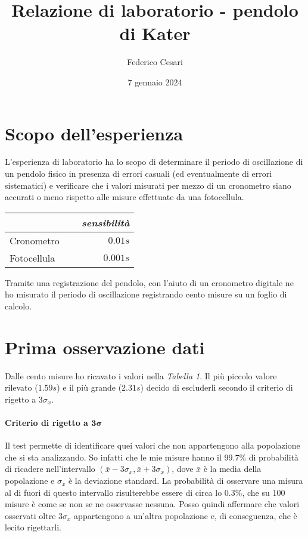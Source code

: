\documentclass{article}
\title{Relazione di laboratorio - pendolo di Kater}
\author{Federico Cesari}
\date{7 gennaio 2024}
\begin{document}
	

	
	\section{Scopo dell'esperienza}
	L'esperienza di laboratorio ha lo scopo di determinare il periodo di oscillazione di un pendolo fisico in presenza di errori casuali (ed eventualmente di errori sistematici) e verificare che i valori misurati per mezzo di un cronometro siano accurati o meno rispetto alle misure effettuate da una fotocellula. 
	
	\vspace{0.5cm}
	\begin{table}[H]
		\centering
		\renewcommand{\arraystretch}{1.5}
		\begin{tabular}{lr}
			 & \textit{sensibilità}\\
			 \hline
			Cronometro $\quad$                	& $0.01s$    \\
			Fotocellula  $\quad$                & $0.001s$    \\
		\end{tabular}
		\renewcommand{\arraystretch}{1}
	\end{table}
	\vspace{0.5cm}
	
	Tramite una registrazione del pendolo, con l'aiuto di un cronometro digitale ne ho misurato il periodo di oscillazione registrando cento misure su un foglio di calcolo. 
	
	
	

	\section{Prima osservazione dati}
	
	Dalle cento misure ho ricavato i valori nella \textit{Tabella 1}. Il più piccolo valore rilevato ($1.59s$) e il più grande ($2.31s$) decido di escluderli secondo il criterio di rigetto a $3\sigma_{x}$.
	
	\paragraph{Criterio di rigetto a $\mathbf{3\sigma}$}
	Il test permette di identificare quei valori che non appartengono alla popolazione che si sta analizzando. So infatti che le mie misure hanno il $99.7 \%$ di probabilità di ricadere nell'intervallo $(\bar{x}  - 3\sigma_{x} , \bar{x} + 3\sigma_{x})$, dove $\bar{x}$ è la media della popolazione e $\sigma_{x}$ è la deviazione standard. La probabilità di osservare una misura al di fuori di questo intervallo risulterebbe essere di circa lo $0.3\%$, che su 100 misure è come se non  se ne osservasse nessuna. Posso quindi affermare che valori osservati oltre $3 \sigma_{x}$ appartengono a un'altra popolazione e, di conseguenza, che è lecito rigettarli. 
	
\end{document}
